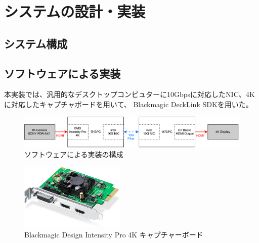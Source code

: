 \chapter{システムの設計・実装}
\label{chap:implementation}



\section{システム構成}



\section{ソフトウェアによる実装}

本実装では、汎用的なデスクトップコンピュターに10Gbpsに対応したNIC、4Kに対応したキャプチャボードを用いて、
Blackmagic DeckLink SDK\cite{bmd-decklink-sdk}を用いた。

\begin{figure}[htbp]
    \begin{center}
        \includegraphics[bb=0 0 841 121,width=15.5cm]{img/software-implement-flow.pdf}
    \end{center}
    \caption{ソフトウェアによる実装の構成}
    \label{fig:software-implement-flow}
\end{figure}

\begin{figure}[htbp]
    \begin{center}
        \includegraphics[bb=0 0 644 410,width=5cm]{img/bmd-intensity-pro-4k.jpg}
    \end{center}
    \caption{Blackmagic Design Intensity Pro 4K キャプチャーボード}
    \label{fig:ted-4k-fmc-card}
\end{figure}

